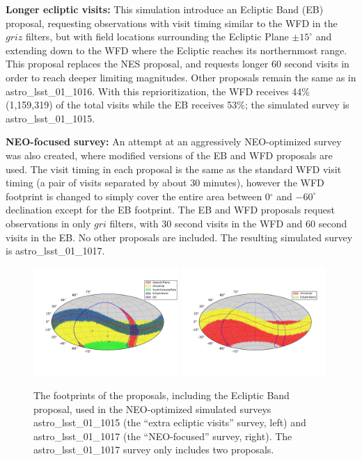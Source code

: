 \textbf{Longer ecliptic visits:} This simulation introduce an Ecliptic Band (EB) proposal, requesting observations with visit timing similar to the WFD in the $griz$ filters, but with field locations surrounding the Ecliptic Plane $\pm15^\circ$ and extending down to the WFD where the Ecliptic reaches its northernmost  range. This proposal replaces the NES proposal, and requests longer 60 second visits in order to reach deeper limiting magnitudes. Other proposals remain the same as in astro\_lsst\_01\_1016. With this reprioritization, the WFD receives 44\% (1,159,319) of the total visits while the EB receives 53\%; the simulated survey is astro\_lsst\_01\_1015.

\textbf{NEO-focused survey:} An attempt at an aggressively NEO-optimized survey was also created, where modified versions of the EB and WFD proposals are used. The visit timing in each proposal is the same as the standard WFD visit timing (a pair of visits separated by about 30 minutes), however the WFD footprint is changed to simply cover the entire area between 0$^\circ$ and $-60^\circ$ declination except for the EB footprint. The EB and WFD proposals request observations in only $gri$ filters, with 30 second visits in the WFD and 60 second visits in the EB. No other proposals are included. The resulting simulated survey is astro\_lsst\_01\_1017.

\begin{figure}[t!]
\centering
\includegraphics[width=0.49\textwidth]{figures/astro_lsst_01_1015_proposal_footprint}
\includegraphics[width=0.49\textwidth]{figures/astro_lsst_01_1017_proposal_footprint}
\vskip -0.5in
\caption{The footprints of the proposals, including the Ecliptic Band proposal, used in the NEO-optimized simulated surveys astro\_lsst\_01\_1015 (the ``extra ecliptic visits'' survey, left) and astro\_lsst\_01\_1017 (the ``NEO-focused'' survey, right). The astro\_lsst\_01\_1017 survey only includes two proposals.
\label{fig:neo_footprints}}
\end{figure}


